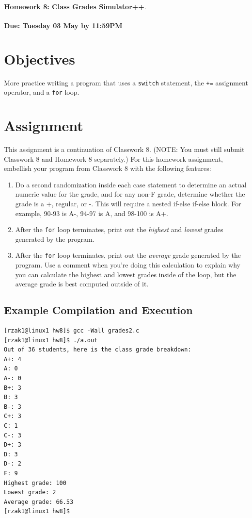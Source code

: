 \documentclass[letter,11pt]{article}
\begin{document}
\huge
\textbf{Homework 8: Class Grades Simulator++}.
\normalsize
\\ ~~ \\
\textbf{Due: Tuesday 03 May by 11:59PM}

\section*{Objectives}
\paragraph{}More practice writing a program that uses a \texttt{switch} statement, the \texttt{+=} assignment operator, and a \texttt{for} loop.

\section*{Assignment}
\paragraph{}This assignment is a continuation of Classwork 8. (NOTE: You must still submit Classwork 8 and Homework 8 separately.) For this homework assignment, embellish your program from Classwork 8 with the following features:
\begin{enumerate}
    \item Do a second randomization inside each case statement to determine an actual numeric value for the grade, and for any non-F grade, determine whether the grade is a +, regular, or -. This will require a nested if-else if-else block. For example, 90-93 is A-, 94-97 is A, and 98-100 is A+.
    \item After the \texttt{for} loop terminates, print out the \textit{highest} and \textit{lowest} grades generated by the program.
    \item After the \texttt{for} loop terminates, print out the \textit{average} grade generated by the program. Use a comment when you're doing this calculation to explain why you can calculate the highest and lowest grades inside of the loop, but the average grade is best computed outside of it.
\end{enumerate}

\subsection*{Example Compilation and Execution}
\begin{verbatim}
[rzak1@linux1 hw8]$ gcc -Wall grades2.c
[rzak1@linux1 hw8]$ ./a.out
Out of 36 students, here is the class grade breakdown:
A+: 4
A: 0
A-: 0
B+: 3
B: 3
B-: 3
C+: 3
C: 1
C-: 3
D+: 3
D: 3
D-: 2
F: 9
Highest grade: 100
Lowest grade: 2
Average grade: 66.53
[rzak1@linux1 hw8]$ 
\end{verbatim}
\end{document}
